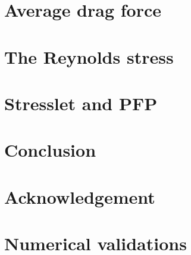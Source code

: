 \documentclass[12pt]{My_preprint}
\begin{document}
\section{Average drag force}



\section{The Reynolds stress}





%

\section{Stresslet and PFP}
 
 


\section{Conclusion}


\section*{Acknowledgement}

\appendix
\section{Numerical validations}
\label{ap:A}
\end{document}
